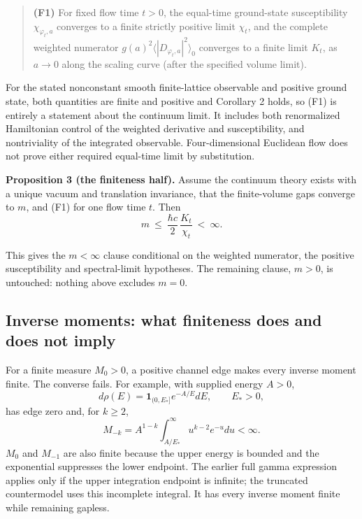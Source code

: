 \documentclass[11pt,a4paper]{article}
\begin{document}
\begin{quote}
\textbf{(F1)} For fixed flow time \(t>0\), the equal-time ground-state
susceptibility \(\chi_{\varphi_t,a}\) converges to a finite strictly
positive limit \(\chi_t\), and the complete weighted numerator
\(g(a)^2\langle|D_{\varphi_t,a}|^2\rangle_0\) converges to a finite
limit \(K_t\), as \(a\to0\) along the scaling curve (after the specified
volume limit).
\end{quote}

For the stated nonconstant smooth finite-lattice observable and positive
ground state, both quantities are finite and positive and Corollary 2
holds, so (F1) is entirely a statement about the continuum limit. It
includes both renormalized Hamiltonian control of the weighted
derivative and susceptibility, and nontriviality of the integrated
observable. Four-dimensional Euclidean flow does not prove either
required equal-time limit by substitution.

\textbf{Proposition 3 (the finiteness half).} Assume the continuum
theory exists with a unique vacuum and translation invariance, that the
finite-volume gaps converge to \(m\), and (F1) for one flow time \(t\).
Then \[m\ \le\ \frac{\hbar c}{2}\,\frac{K_t}{\chi_t}\ <\ \infty .\]

This gives the \(m<\infty\) clause conditional on the weighted
numerator, the positive susceptibility and spectral-limit hypotheses.
The remaining clause, \(m>0\), is untouched: nothing above excludes
\(m=0\).

\hypertarget{inverse-moments-what-finiteness-does-and-does-not-imply}{%
\subsection{Inverse moments: what finiteness does and does not
imply}\label{inverse-moments-what-finiteness-does-and-does-not-imply}}

For a finite measure \(M_0>0\), a positive channel edge makes every
inverse moment finite. The converse fails. For example, with supplied
energy \(A>0\), \[d\rho(E)=\mathbf1_{(0,E_*]}e^{-A/E}dE,\qquad E_*>0,\]
has edge zero and, for \(k\ge2\),
\[M_{-k}=A^{1-k}\int_{A/E_*}^{\infty}u^{k-2}e^{-u}du<\infty.\] \(M_0\)
and \(M_{-1}\) are also finite because the upper energy is bounded and
the exponential suppresses the lower endpoint. The earlier full gamma
expression applies only if the upper integration endpoint is infinite;
the truncated countermodel uses this incomplete integral. It has every
inverse moment finite while remaining gapless.
\end{document}
